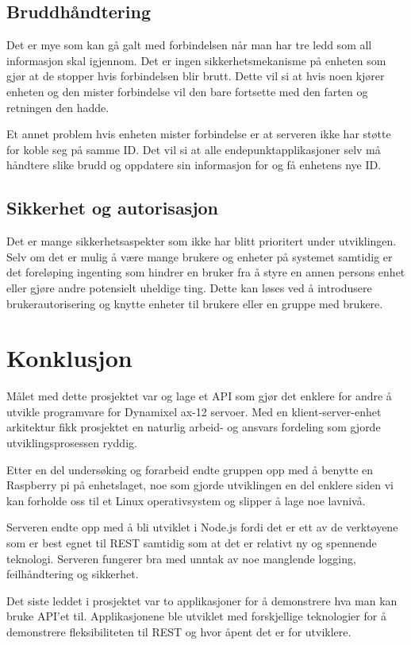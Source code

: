 \documentclass[12pt]{report}
\begin{document}
\section{Bruddhåndtering}
Det er mye som kan gå galt med forbindelsen når man har tre ledd som all informasjon skal igjennom. Det er ingen sikkerhetsmekanisme på enheten som gjør at de stopper hvis forbindelsen blir brutt. Dette vil si at hvis noen kjører enheten og den mister forbindelse vil den bare fortsette med den farten og retningen den hadde.

Et annet problem hvis enheten mister forbindelse er at serveren ikke har støtte for koble seg på samme ID. Det vil si at alle endepunktapplikasjoner selv må håndtere slike brudd og oppdatere sin informasjon for og få enhetens nye ID.

\section{Sikkerhet og autorisasjon}
Det er mange sikkerhetsaspekter som ikke har blitt prioritert under utviklingen. Selv om det er mulig å være mange brukere og enheter på systemet samtidig er det foreløping ingenting som hindrer en bruker fra å styre en annen persons enhet eller gjøre andre potensielt uheldige ting. Dette kan løses ved å introdusere brukerautorisering og knytte enheter til brukere eller en gruppe med brukere. 

\clearpage

\chapter{Konklusjon}
Målet med dette prosjektet var og lage et API som gjør det enklere for andre å utvikle programvare for Dynamixel ax-12 servoer. Med en klient-server-enhet arkitektur fikk prosjektet en naturlig arbeid- og ansvars fordeling som gjorde utviklingsprosessen ryddig. 

Etter en del undersøking og forarbeid endte gruppen opp med å benytte en Raspberry pi på enhetslaget, noe som gjorde utviklingen en del enklere siden vi kan forholde oss til et Linux operativsystem og slipper å lage noe lavnivå.

Serveren endte opp med å bli utviklet i Node.js fordi det er ett av de verktøyene som er best egnet til REST samtidig som at det er relativt ny og spennende teknologi. Serveren fungerer bra med unntak av noe manglende logging, feilhåndtering og sikkerhet.

Det siste leddet i prosjektet var to applikasjoner for å demonstrere hva man kan bruke API’et til. Applikasjonene ble utviklet med forskjellige teknologier for å demonstrere fleksibiliteten til REST og hvor åpent det er for utviklere.
\end{document}
